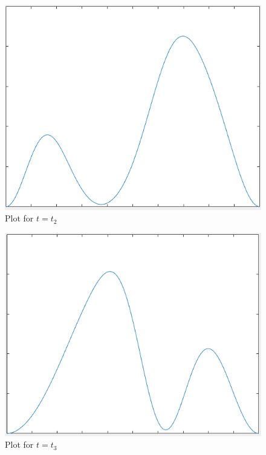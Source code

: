 \documentclass[a4paper]{article}
\begin{document}
\begin{enumerate}[(a)]
\begin{figure}[H]
        \label{P1}
    \end{figure}
    \begin{figure}[H]
        \centering
        \includegraphics[scale=0.5]{P2.png}
        \caption{Plot for $t=t_2$}
        \label{P2}
    \end{figure}
    \begin{figure}[H]
        \centering
        \includegraphics[scale=0.5]{P3.png}
        \caption{Plot for $t=t_3$}
        \label{P3}
    \end{figure}
    \begin{figure}[H]
        \centering

\end{figure}
\end{enumerate}
\end{document}
